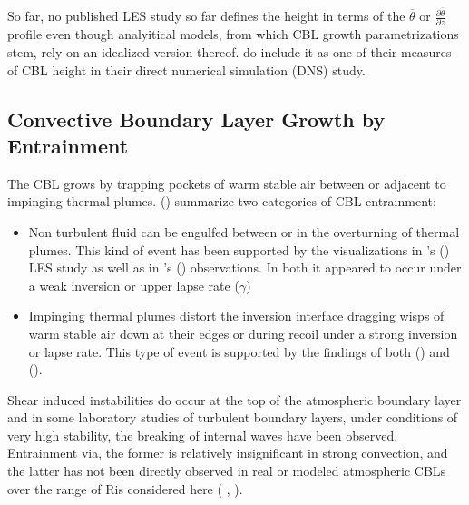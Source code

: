 So far, no published \acs{LES} study so far defines the height in terms of the $\overline{\theta}$ or $\frac{\partial \overline{\theta}}{\partial z}$ profile even though analyitical models, from which \acs{CBL} growth parametrizations stem, rely on an idealized version thereof. \citeauthor{GarciaMellado} \citeyear{GarciaMellado} do include it as one of their measures of \acs{CBL} height in their direct numerical
simulation (\acs{DNS}) study.       

\subsection{Convective Boundary Layer Growth by Entrainment}
\label{subsec:}

The \acs{CBL} grows by trapping pockets of warm stable air between
or adjacent to impinging thermal plumes.  \citeauthor{Traum11} (\citeyear{Traum11}) summarize two categories of \acs{CBL} entrainment:\\

\begin{itemize}

\item{Non turbulent fluid can be engulfed between or in the overturning of thermal plumes. This kind of event has been supported by the visualizations in \citeauthor{SullMoengStev}'s (\citeyear{SullMoengStev}) \acs{LES} study as well as in \citeauthor{Traum11}'s (\citeyear{Traum11}) observations. In both it appeared to occur under a weak inversion or upper lapse rate ($\gamma$)}

\item{
Impinging thermal plumes distort the inversion interface dragging wisps of warm stable air down at their edges or during recoil under a strong inversion or lapse rate. This type of event is supported by the findings  of both \citeauthor{SullMoengStev} (\citeyear{SullMoengStev}) and \citeauthor{Traum11} (\citeyear{Traum11}).}

\end{itemize}

Shear induced instabilities do occur at the top of the atmospheric boundary layer and in some laboratory studies of turbulent boundary layers, under conditions of very high stability, the breaking of internal waves have been observed.  Entrainment via, the former is relatively insignificant in strong convection, and the latter has not been directly observed in real or modeled atmospheric \acs{CBL}s over the range of \acs{Ri}s considered here (\citeauthor{Traum11} \citeyear{Traum11}, \citeauthor{SullMoengStev} \citeyear{SullMoengStev}).

